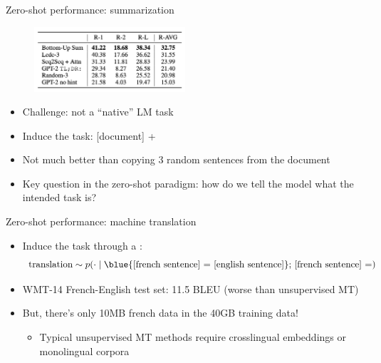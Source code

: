 \documentclass[usenames,dvipsnames,notes,11pt,aspectratio=169,hyperref={colorlinks=true, linkcolor=blue}]{beamer}
\begin{document}
\begin{frame}
    {Zero-shot performance: summarization}
    \begin{figure}
        \includegraphics[width=0.5\textwidth]{figures/gpt2-sum}
    \end{figure}
    \begin{itemize}
        \item Challenge: not a ``native'' LM task
        \item Induce the task: [document] + \blue{[TL;DR]}
        \item Not much better than copying 3 random sentences from the document 
        \item Key question in the zero-shot paradigm: how do we tell the model what the intended task is?
    \end{itemize}
\end{frame}

\begin{frame}
    {Zero-shot performance: machine translation}
    
    \begin{itemize}
        \item Induce the task through a :
            $$
                \text{translation} \sim p(\cdot \mid \text{\blue{[french sentence] = [english sentence]}; [french sentence] =})
            $$
        \item WMT-14 French-English test set: 11.5 BLEU (worse than unsupervised MT)
        \item But, there's only 10MB french data in the 40GB training data!
            \begin{itemize}
                \item Typical unsupervised MT methods require crosslingual embeddings or monolingual corpora
            \end{itemize}
    \end{itemize}
\end{frame}
\end{document}
